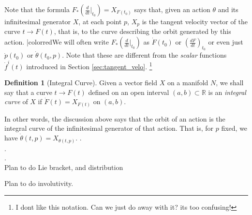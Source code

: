 \documentclass[psamsfonts]{amsart}
\theoremstyle{definition}
\newtheorem{defn}[thm]{Definition}
\theoremstyle{remark}
\newcommand*\R{\mathds{R}}
\numberwithin{equation}{section}
\begin{document}
Note that the formula $F_*(\frac{d}{dt}\bigr|_{t_0}) = X_{F(t_0)}$ says that, given an action $\theta$ and its infinitesimal generator $X$, at each point $p$, $X_p$ is the tangent velocity vector of the curve $t\rightarrow F(t)$, that is, to the curve describing the orbit generated by this action. {|color{red}We will often write $F_*(\frac{d}{dt}\bigr|_{t_0})$ as $\dot F(t_0)$ or $\left(\frac{dF}{dt}\right)_{t_0}$ or even just $\dot p(t_0)$ or $\dot \theta(t_0, p)$. Note that these are different from the \textit{scalar} functions $\dot f^i(t)$ introduced in Section \ref{sec:tangent_velo}. }\footnote{I dont like this notation. Can we just do away with it? its too confusing!}

\begin{defn}[Integral Curve]
Given a vector field $X$ on a manifold $N$, we shall say that a curve $t\rightarrow F(t)$ defined on an open interval $(a,b)\subset \R$ is an \textit{integral curve} of $X$ if $\dot F(t) = X_{F(t)}$ on $(a, b)$.
\end{defn}
In other words, the discussion above says that the orbit of an action is the integral curve of the infinitesimal generator of that action. That is, for $p$ fixed, we have $\dot \theta(t,p) = X_{\theta(t,p)}$. 
.\\
.\\
.\\


Plan to do Lie bracket, and distribution

Plan to do involutivity. 
\end{document}
